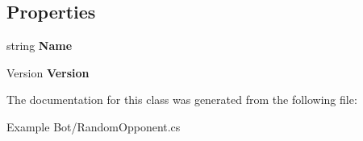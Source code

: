 \subsection*{Properties}
\begin{DoxyCompactItemize}
\item 
\hypertarget{class_m_b_c_core_1_1_random_bot_a666e4130230bfff161861f5f865db6d7}{string {\bfseries Name}}\label{class_m_b_c_core_1_1_random_bot_a666e4130230bfff161861f5f865db6d7}

\item 
\hypertarget{class_m_b_c_core_1_1_random_bot_a7be30adfe72bacb0f07c03e11b277611}{Version {\bfseries Version}}\label{class_m_b_c_core_1_1_random_bot_a7be30adfe72bacb0f07c03e11b277611}

\end{DoxyCompactItemize}


The documentation for this class was generated from the following file\-:\begin{DoxyCompactItemize}
\item 
Example Bot/Random\-Opponent.\-cs\end{DoxyCompactItemize}
